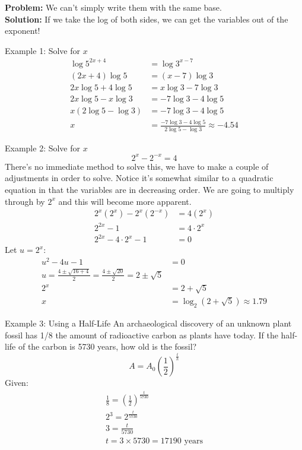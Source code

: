 \documentclass{article}
\begin{document}
\noindent \textbf{Problem:} We can't simply write them with the same base.\\
\textbf{Solution:} If we take the log of both sides, we can get the variables out of the exponent!

\begin{examplebox}{Example 1: Solve for \( x \)}
\begin{align*}
    \log{5^{2x+4}} &= \log{3^{x-7}}\\
    (2x+4) \log{5} &= (x-7) \log{3}\\
    2x \log{5} + 4 \log{5} &= x \log{3} - 7 \log{3}\\
    2x \log{5} - x \log{3} &= -7 \log{3} - 4 \log{5}\\
    x (2 \log{5} - \log{3}) &= -7 \log{3} - 4 \log{5}\\
    x &= \frac{-7 \log{3} - 4 \log{5}}{2 \log{5} - \log{3}} \approx -4.54
\end{align*}
\end{examplebox}
\begin{examplebox}{Example 2: Solve for \( x \)}
\[
2^x - 2^{-x} = 4
\]
There's no immediate method to solve this, we have to make a couple of adjustments in order to solve. Notice it's somewhat similar to a quadratic equation in that the variables are in decreasing order. We are going to multiply through by \( 2^x \) and this will become more apparent.
\begin{align*}
    2^x (2^x) - 2^x (2^{-x}) &= 4 (2^x)\\
    2^{2x} - 1 &= 4 \cdot 2^x\\
    2^{2x} - 4 \cdot 2^x - 1 &= 0
\end{align*}
Let \( u = 2^x \):
\begin{align*}
    u^2 - 4u - 1 &= 0\\
    u = \frac{4 \pm \sqrt{16 + 4}}{2} = \frac{4 \pm \sqrt{20}}{2} = 2 \pm \sqrt{5}\\
    2^x &= 2 + \sqrt{5}\\
    x &= \log_2 (2 + \sqrt{5}) \approx 1.79
\end{align*}
\end{examplebox}

\begin{examplebox}{Example 3: Using a Half-Life}
An archaeological discovery of an unknown plant fossil has 1/8 the amount of radioactive carbon as plants have today. If the half-life of the carbon is 5730 years, how old is the fossil?
\[
A = A_0 \left(\frac{1}{2}\right)^{\frac{t}{h}}
\]
Given:
\begin{align*}
\frac{1}{8} = \left(\frac{1}{2}\right)^{\frac{t}{5730}} \\
2^3 = 2^{\frac{t}{5730}} \\
3 = \frac{t}{5730}\\
t = 3 \times 5730 = 17190 \text{ years}
\end{align*}

\end{examplebox}
\end{document}
